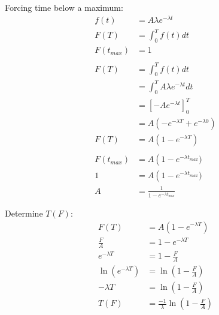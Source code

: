 \documentclass[12pt]{article}
\begin{document}
Forcing time below a maximum:
\begin{align*}
	f(t) &= A \lambda e^{-\lambda t} \\
	F(T) &= \int_{0}^{T} f(t) dt \\
	F(t_{max}) &= 1 \\
	\\
	F(T) &= \int_{0}^{T} f(t) dt \\
		&= \int_{0}^{T} A \lambda e^{-\lambda t} dt \\
		&= \left[-A e^{-\lambda t}\right]_{0}^{T} \\
		&= A\left(-e^{-\lambda T} + e^{-\lambda 0}\right) \\
	F(T) &= A\left(1 - e^{-\lambda T}\right) \\
	\\
	F(t_{max}) &= A\left(1 - e^{-\lambda t_{max}}) \\
	1 &= A\left(1 - e^{-\lambda t_{max}}) \\
	A &= \frac{1}{1 - e^{-\lambda t_{max}}}
\end{align*}

Determine $T(F)$:
\begin{align*}
	F(T) &= A\left(1 - e^{-\lambda T}\right) \\
	\frac{F}{A} &= 1 - e^{-\lambda T} \\
	e^{-\lambda T} &= 1 - \frac{F}{A} \\
	\ln\left(e^{-\lambda T}\right) &= \ln\left(1 - \frac{F}{A}\right) \\
	-\lambda T &= \ln\left(1 - \frac{F}{A}\right) \\
	T(F) &= \frac{-1}{\lambda}\ln\left(1 - \frac{F}{A}\right) \\
\end{align*}
\end{document}
